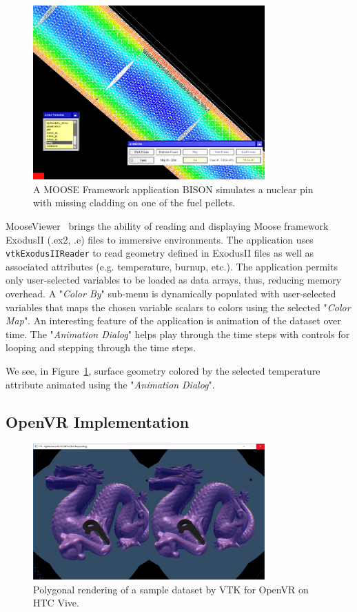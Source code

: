 \begin{figure}[h!]
 \centering
 \includegraphics[width=3.5in]{images/fuelpin.png}
 \caption{A MOOSE Framework application BISON simulates a nuclear pin with missing cladding on one of the fuel pellets.}
 \label{fig:fuelpin}
\end{figure}

MooseViewer~\cite{MooseViewer} brings the ability of reading and displaying Moose framework~\cite{Gaston:2015, MooseFramework} ExodusII (.ex2, .e) files to immersive environments. The application uses \texttt{vtkExodusIIReader} to read geometry defined in ExodusII files as well as associated attributes (e.g. temperature, burnup, etc.). The application permits only user-selected variables to be loaded as data arrays, thus, reducing memory overhead. A "\textit{Color By}" sub-menu is dynamically populated with user-selected variables that maps the chosen variable scalars to colors using the selected "\textit{Color Map}".
An interesting feature of the application is animation of the dataset over time.
The "\textit{Animation Dialog}" helps play through the time steps with controls for looping and stepping through the time steps.

We see, in Figure~\ref{fig:fuelpin}, surface geometry colored by the selected temperature attribute animated using the "\textit{Animation Dialog}".

\subsection{OpenVR Implementation}
\begin{figure}[h!]
  \centering
  \includegraphics[width=3.5in]{images/Dragon.jpg}
  \caption{Polygonal rendering of a sample dataset by VTK for OpenVR on HTC Vive.}
  \label{fig:openvrdragon}
\end{figure}


